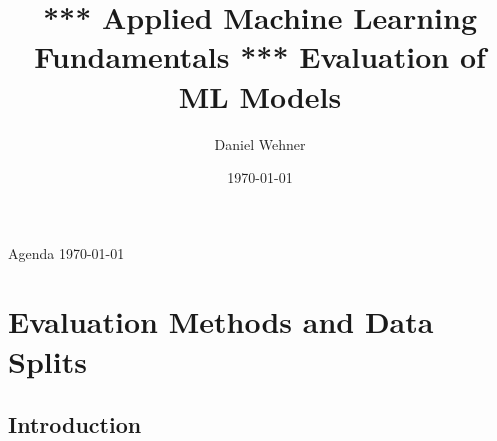 


\title[Evaluation of ML Models]{*** Applied Machine Learning Fundamentals *** Evaluation of ML Models}
\author{Daniel Wehner}
\date{\today}




\maketitlepage


\begin{frame}{Agenda \today}
	\begin{multicols}{2}
		\tableofcontents
	\end{multicols}
\end{frame}


\section{Evaluation Methods and Data Splits}

\subsection{Introduction}

